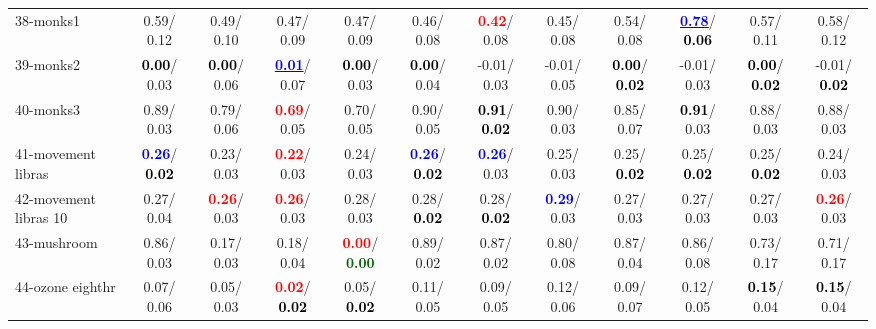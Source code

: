 \begin{table}[h]
\begin{center}
{\begin{tabular}{lc|c|c|c|c|c|c|c|c|c|c}
38-monks1 &   0.59/  0.12 &   0.49/  0.10 &   0.47/  0.09 &   0.47/  0.09 &   0.46/  0.08 & \textcolor{red}{\textbf{  0.42}}/  0.08 &   0.45/  0.08 &   0.54/  0.08 & \underline{\textcolor{blue}{\textbf{  0.78}}}/\textcolor{black}{\textbf{  0.06}} &   0.57/  0.11 &   0.58/  0.12 \\
39-monks2 & \textcolor{black}{\textbf{  0.00}}/  0.03 & \textcolor{black}{\textbf{  0.00}}/  0.06 & \underline{\textcolor{blue}{\textbf{  0.01}}}/  0.07 & \textcolor{black}{\textbf{  0.00}}/  0.03 & \textcolor{black}{\textbf{  0.00}}/  0.04 &  -0.01/  0.03 &  -0.01/  0.05 & \textcolor{black}{\textbf{  0.00}}/\textcolor{black}{\textbf{  0.02}} &  -0.01/  0.03 & \textcolor{black}{\textbf{  0.00}}/\textcolor{black}{\textbf{  0.02}} &  -0.01/\textcolor{black}{\textbf{  0.02}} \\ \hline
40-monks3 &   0.89/  0.03 &   0.79/  0.06 & \textcolor{red}{\textbf{  0.69}}/  0.05 &   0.70/  0.05 &   0.90/  0.05 & \textcolor{black}{\textbf{  0.91}}/\textcolor{black}{\textbf{  0.02}} &   0.90/  0.03 &   0.85/  0.07 & \textcolor{black}{\textbf{  0.91}}/  0.03 &   0.88/  0.03 &   0.88/  0.03 \\
41-movement libras & \textcolor{blue}{\textbf{  0.26}}/\textcolor{black}{\textbf{  0.02}} &   0.23/  0.03 & \textcolor{red}{\textbf{  0.22}}/  0.03 &   0.24/  0.03 & \textcolor{blue}{\textbf{  0.26}}/\textcolor{black}{\textbf{  0.02}} & \textcolor{blue}{\textbf{  0.26}}/  0.03 &   0.25/  0.03 &   0.25/\textcolor{black}{\textbf{  0.02}} &   0.25/\textcolor{black}{\textbf{  0.02}} &   0.25/\textcolor{black}{\textbf{  0.02}} &   0.24/  0.03 \\
42-movement libras 10 &   0.27/  0.04 & \textcolor{red}{\textbf{  0.26}}/  0.03 & \textcolor{red}{\textbf{  0.26}}/  0.03 &   0.28/  0.03 &   0.28/\textcolor{black}{\textbf{  0.02}} &   0.28/\textcolor{black}{\textbf{  0.02}} & \textcolor{blue}{\textbf{  0.29}}/  0.03 &   0.27/  0.03 &   0.27/  0.03 &   0.27/  0.03 & \textcolor{red}{\textbf{  0.26}}/  0.03 \\
43-mushroom &   0.86/  0.03 &   0.17/  0.03 &   0.18/  0.04 & \textcolor{red}{\textbf{  0.00}}/\textcolor{darkgreen}{\textbf{  0.00}} &   0.89/  0.02 &   0.87/  0.02 &   0.80/  0.08 &   0.87/  0.04 &   0.86/  0.08 &   0.73/  0.17 &   0.71/  0.17 \\
44-ozone eighthr &   0.07/  0.06 &   0.05/  0.03 & \textcolor{red}{\textbf{  0.02}}/\textcolor{black}{\textbf{  0.02}} &   0.05/\textcolor{black}{\textbf{  0.02}} &   0.11/  0.05 &   0.09/  0.05 &   0.12/  0.06 &   0.09/  0.07 &   0.12/  0.05 & \textcolor{black}{\textbf{  0.15}}/  0.04 & \textcolor{black}{\textbf{  0.15}}/  0.04 \\

\end{tabular}}
\end{center}
\end{table}
